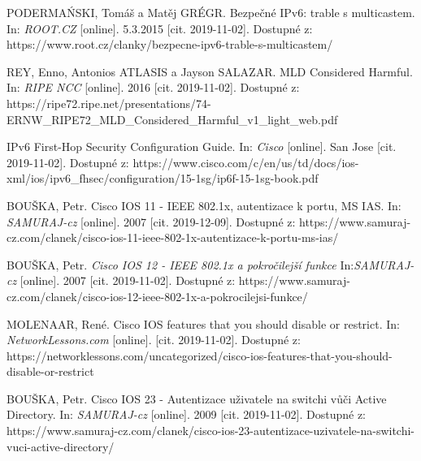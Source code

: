 \begin{literatura}{99}
PODERMAŃSKI, Tomáš a Matěj GRÉGR. Bezpečné IPv6: trable s multicastem. In: \textit{ROOT.CZ} [online]. 5.3.2015 [cit. 2019-11-02]. Dostupné z: https://www.root.cz/clanky/bezpecne-ipv6-trable-s-multicastem/

REY, Enno, Antonios ATLASIS a Jayson SALAZAR. MLD Considered Harmful. In: \textit{RIPE NCC} [online]. 2016 [cit. 2019-11-02]. Dostupné z: https://ripe72.ripe.net/presentations/74-ERNW\_RIPE72\_MLD\_Considered\_Harmful\_v1\_light\_web.pdf






	
	
	








IPv6 First-Hop Security Configuration Guide. In: \textit{Cisco} [online]. San Jose [cit. 2019-11-02]. Dostupné z: https://www.cisco.com/c/en/us/td/docs/ios-xml/ios/ipv6\_fhsec/configuration/15-1sg/ip6f-15-1sg-book.pdf

BOUŠKA, Petr. Cisco IOS 11 - IEEE 802.1x, autentizace k portu, MS IAS. In: \textit{SAMURAJ-cz} [online]. 2007 [cit. 2019-12-09]. Dostupné z: https://www.samuraj-cz.com/clanek/cisco-ios-11-ieee-802-1x-autentizace-k-portu-ms-ias/


BOUŠKA, Petr. \textit{Cisco IOS 12 - IEEE 802.1x a pokročilejší funkce}  In:\textit{SAMURAJ-cz} [online]. 2007 [cit. 2019-11-02]. Dostupné z: https://www.samuraj-cz.com/clanek/cisco-ios-12-ieee-802-1x-a-pokrocilejsi-funkce/

MOLENAAR, René. Cisco IOS features that you should disable or restrict. In: \textit{NetworkLessons.com} [online]. [cit. 2019-11-02]. Dostupné z: https://networklessons.com/uncategorized/cisco-ios-features-that-you-should-disable-or-restrict

BOUŠKA, Petr. Cisco IOS 23 - Autentizace uživatele na switchi vůči Active Directory. In: \textit{SAMURAJ-cz} [online]. 2009 [cit. 2019-11-02]. Dostupné z: https://www.samuraj-cz.com/clanek/cisco-ios-23-autentizace-uzivatele-na-switchi-vuci-active-directory/


\end{literatura}
